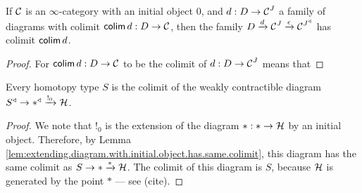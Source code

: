 \begin{lem}\label{lem:extending.diagram.with.initial.object.has.same.colimit}
If $\operatorname{\mathcal{C}}$ is an $\infty$-category with an initial object $0$, and $d : D \to
\operatorname{\mathcal{C}}^J$ a family of diagrams with colimit $\operatorname{\mathsf{colim}} d : D \to \operatorname{\mathcal{C}}$, then the family
$D \xrightarrow{d} \operatorname{\mathcal{C}}^J \xrightarrow{\epsilon} \operatorname{\mathcal{C}}^{J^{\triangleleft}}$ has colimit $\operatorname{\mathsf{colim}} d$.
\end{lem}
\begin{proof}
For $\operatorname{\mathsf{colim}} d : D \to \operatorname{\mathcal{C}}$ to be the colimit of $d : D \to \operatorname{\mathcal{C}}^J$ means that
\end{proof}


\begin{lem}\label{lem:every.type.weakly.contractible.colimit}
Every homotopy type $S$ is the colimit of the weakly contractible diagram
$S^{\triangleleft} \to \ast^{\triangleleft} \xrightarrow{!_0} \operatorname{\mathcal{H}}$.
\end{lem}
\begin{proof}
We note that $!_0$ is the extension of the diagram $\ast : \ast \to \operatorname{\mathcal{H}}$ by an
initial object. Therefore, by Lemma
\ref{lem:extending.diagram.with.initial.object.has.same.colimit}, this diagram
has the same colimit as $S \to \ast \xrightarrow{\ast} \operatorname{\mathcal{H}}$. The colimit of this diagram
is $S$, because $\operatorname{\mathcal{H}}$ is generated by the point $\ast$ --- see (cite). 
\end{proof}